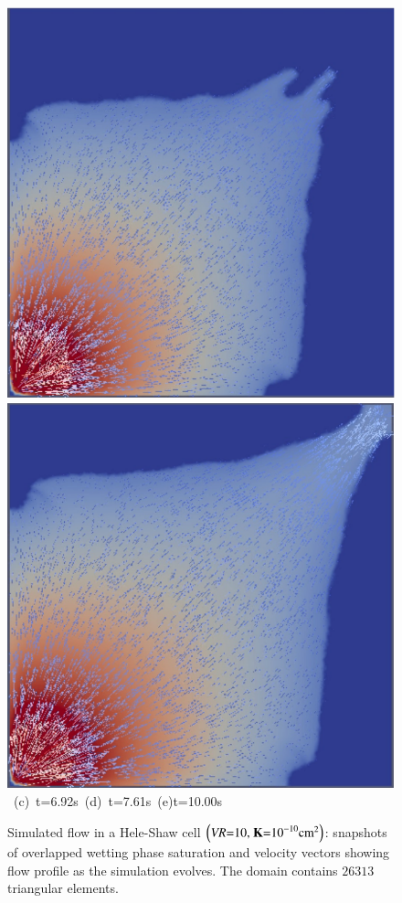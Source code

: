 \begin{landscape}
\begin{figure}[ht]
{{      \includegraphics[width=.5\textwidth]{./Pics1/Saffman_homogeneous_VR10/ST_Homog_VR10_D2201c}
      \includegraphics[width=.51\textwidth]{./Pics1/Saffman_homogeneous_VR10/ST_Homog_VR10_D3001c}}
\vspace{0.cm}
\hbox{ \hspace{2.cm} (c) t=6.92s \hspace{4.5cm} (d) t=7.61s \hspace{5.cm} (e)t=10.00s}
\vspace{0.cm}
}   
\caption{Simulated flow in a Hele-Shaw cell $\left(\text{{\it VR}=10, {\bf K}=10}^{-10}\text{cm}^{2}\right)$: snapshots of overlapped wetting phase saturation and velocity vectors showing flow profile as the simulation evolves. The domain contains $26313$  triangular elements.}
\label{fig:homoheleshaw_VN10}
\end{figure}
\end{landscape}
\clearpage

